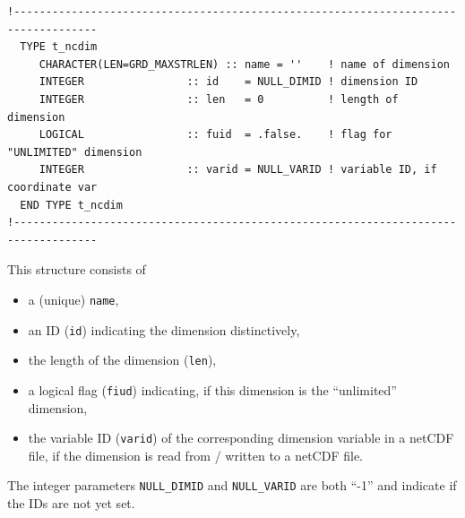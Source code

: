 \documentclass[11pt,twoside]{article}
\begin{document}
\begin{verbatim}
!-----------------------------------------------------------------------------------
  TYPE t_ncdim
     CHARACTER(LEN=GRD_MAXSTRLEN) :: name = ''    ! name of dimension
     INTEGER                :: id    = NULL_DIMID ! dimension ID
     INTEGER                :: len   = 0          ! length of dimension
     LOGICAL                :: fuid  = .false.    ! flag for "UNLIMITED" dimension
     INTEGER                :: varid = NULL_VARID ! variable ID, if coordinate var
  END TYPE t_ncdim
!-----------------------------------------------------------------------------------
\end{verbatim}
This structure consists of 
\begin{itemize}
\item a (unique) \verb|name|, 
\item an ID (\verb|id|) indicating the dimension distinctively,
\item the length of the dimension (\verb|len|),
\item a logical flag (\verb|fiud|) indicating, if this dimension is the ``unlimited'' dimension,
\item the variable ID (\verb|varid|) of the corresponding dimension
variable in a netCDF file, if the dimension is read from / written to
a netCDF file. 
\end{itemize}
The integer parameters \verb|NULL_DIMID| and \verb|NULL_VARID| are
 both ``-1'' and indicate if the IDs are not yet set.
\end{document}
